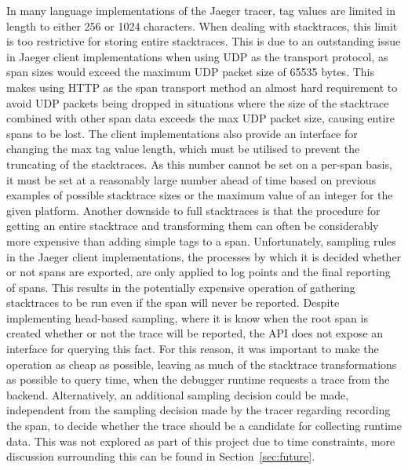 \documentclass[12pt,pdftex,titlepage]{report}
\begin{document}
                In many language implementations of the Jaeger tracer, tag values are limited in length to either 256 or 1024 characters. When dealing with stacktraces, this limit is too 
                restrictive for storing entire stacktraces. This is due to an outstanding issue in Jaeger client implementations when using UDP as the transport protocol, as span sizes
                would exceed the maximum UDP packet size of 65535 bytes\cite{udptagsize}. This makes using HTTP as the span transport method an almost hard requirement to avoid UDP packets being
                dropped in situations where the size of the stacktrace combined with other span data exceeds the max UDP packet size, causing entire spans to be lost. The client implementations also
                provide an interface for changing the max tag value length, which must be utilised to prevent the truncating of the stacktraces. As this number cannot be set on a per-span basis, 
                it must be set at a reasonably large number ahead of time based on previous examples of possible stacktrace sizes or the maximum value of an integer for the given platform. Another 
                downside to full stacktraces is that the procedure for getting an entire stacktrace and transforming them can often be considerably more expensive than adding simple tags to a span. 
                Unfortunately, sampling rules in the Jaeger client implementations, the processes by which it is decided whether or not spans are exported, are only applied to log points and the final 
                reporting of spans. This results in the potentially expensive operation of gathering stacktraces to be run even if the span will never be reported. Despite implementing head-based sampling, 
                where it is know when the root span is created whether or not the trace will be reported, the API does not expose an interface for querying this fact. For this reason, it was important to 
                make the operation as cheap as possible, leaving as much of the stacktrace transformations as possible to query time, when the debugger runtime requests a trace from the backend. Alternatively,
                an additional sampling decision could be made, independent from the sampling decision made by the tracer regarding recording the span, to decide whether the trace should be a candidate for
                collecting runtime data. This was not explored as part of this project due to time constraints, more discussion surrounding this can be found in Section~\ref{sec:future}.
\end{document}
